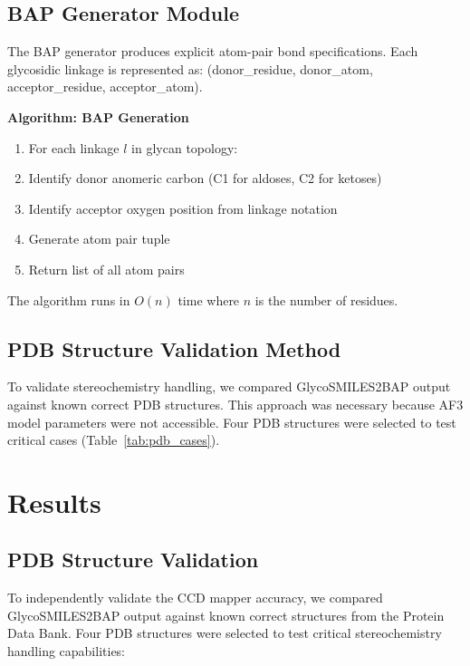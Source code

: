 \documentclass[11pt,a4paper]{article}
\begin{document}
\subsection{BAP Generator Module}

The BAP generator produces explicit atom-pair bond specifications. Each glycosidic linkage is represented as: (donor\_residue, donor\_atom, acceptor\_residue, acceptor\_atom).

\noindent\textbf{Algorithm: BAP Generation}
\begin{enumerate}
\item For each linkage $l$ in glycan topology:
\item \quad Identify donor anomeric carbon (C1 for aldoses, C2 for ketoses)
\item \quad Identify acceptor oxygen position from linkage notation
\item \quad Generate atom pair tuple
\item Return list of all atom pairs
\end{enumerate}

\noindent The algorithm runs in $O(n)$ time where $n$ is the number of residues.

\subsection{PDB Structure Validation Method}

To validate stereochemistry handling, we compared GlycoSMILES2BAP output against known correct PDB structures. This approach was necessary because AF3 model parameters were not accessible. Four PDB structures were selected to test critical cases (Table~\ref{tab:pdb_cases}).
\section{Results}

\subsection{PDB Structure Validation}

To independently validate the CCD mapper accuracy, we compared GlycoSMILES2BAP output against known correct structures from the Protein Data Bank. Four PDB structures were selected to test critical stereochemistry handling capabilities:
\end{document}
